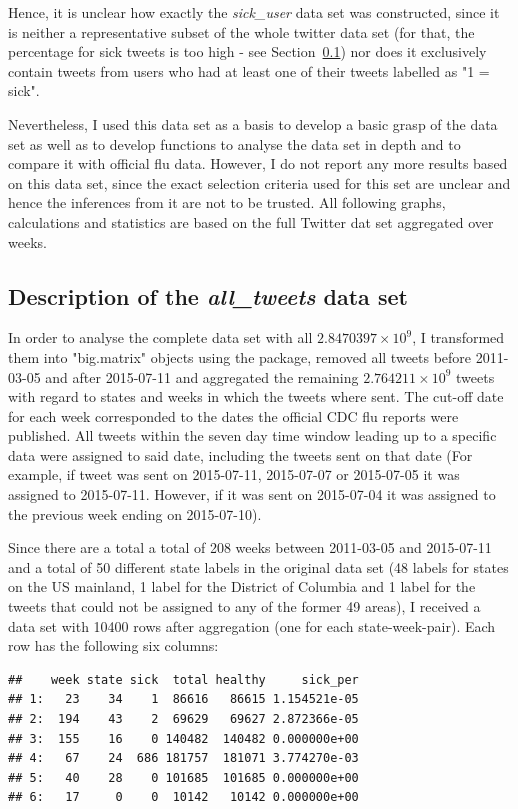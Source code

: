 \documentclass[11pt, a4paper]{article}\usepackage[]{graphicx}\usepackage[]{color}
\makeatletter
\newenvironment{kframe}{%
 \def\at@end@of@kframe{}%
 \ifinner\ifhmode%
  \def\at@end@of@kframe{\end{minipage}}%
  \begin{minipage}{\columnwidth}%
 \fi\fi%
 \def\FrameCommand##1{\hskip\@totalleftmargin \hskip-\fboxsep
 \colorbox{shadecolor}{##1}\hskip-\fboxsep
     \hskip-\linewidth \hskip-\@totalleftmargin \hskip\columnwidth}%
 \MakeFramed {\advance\hsize-\width
   \@totalleftmargin\z@ \linewidth\hsize
   \@setminipage}}%
 {\par\unskip\endMakeFramed%
 \at@end@of@kframe}
\newenvironment{knitrout}{}{} %
\makeatother
\begin{document}
Hence, it is unclear how exactly the \textit{sick\_user} data set was constructed, since it is neither a representative subset of the whole twitter data set (for that, the percentage for sick tweets is too high - see Section~\ref{sec:full_set}) nor does it exclusively contain tweets from users who had at least one of their tweets labelled as "1 = sick".

Nevertheless, I used this data set as a basis to develop a basic grasp of the data set as well as to develop functions to analyse the data set in depth and to compare it with official flu data. However, I do not report any more results based on this data set, since the exact selection criteria used for this set are unclear and hence the inferences from it are not to be trusted. All following graphs, calculations and statistics are based on the full Twitter dat set aggregated over weeks. 

\subsection{Description of the \textit{all\_tweets} data set}
\label{sec:full_set}

In order to analyse the complete data set with all \ensuremath{2.8470397\times 10^{9}}, I transformed them into "big.matrix" objects using the  package, removed all tweets before 2011-03-05 and after 2015-07-11 and aggregated the remaining \ensuremath{2.764211\times 10^{9}} tweets with regard to states and weeks in which the tweets where sent. The cut-off date for each week corresponded to the dates the official CDC flu reports were published. All tweets within the seven day time window leading up to a specific data were assigned to said date, including the tweets sent on that date (For example, if tweet was sent on 2015-07-11, 2015-07-07 or 2015-07-05 it was assigned to 2015-07-11. However, if it was sent on 2015-07-04 it was assigned to the previous week ending on 2015-07-10).\newline

Since there are a total a total of 208 weeks between 2011-03-05 and 2015-07-11 and a total of 50 different state labels in the original data set (48 labels for states on the US mainland, 1 label for the District of Columbia and 1 label for the tweets that could not be assigned to any of the former 49 areas), I received a data set with 10400 rows after aggregation (one for each state-week-pair). Each row has the following six columns:

\begin{knitrout}
\color{fgcolor}\begin{kframe}
\begin{verbatim}
##    week state sick  total healthy     sick_per
## 1:   23    34    1  86616   86615 1.154521e-05
## 2:  194    43    2  69629   69627 2.872366e-05
## 3:  155    16    0 140482  140482 0.000000e+00
## 4:   67    24  686 181757  181071 3.774270e-03
## 5:   40    28    0 101685  101685 0.000000e+00
## 6:   17     0    0  10142   10142 0.000000e+00
\end{verbatim}
\end{kframe}
\end{knitrout}
\end{document}
